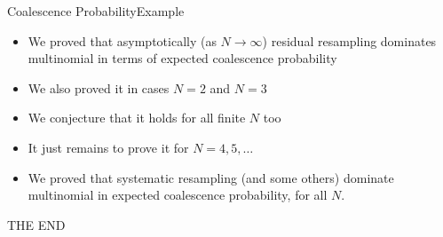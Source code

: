 \documentclass[aspectratio=169]{beamer}
\theoremstyle{definition}
\begin{document}
\begin{frame}{Coalescence Probability}{Example}
\centering

\end{frame}


\begin{frame}
\begin{itemize}
\item We proved that asymptotically (as $N\to\infty$) residual resampling dominates multinomial in terms of expected coalescence probability
\item We also proved it in cases $N=2$ and $N=3$
\pause
\item We conjecture that it holds for all finite $N$ too
\item It just remains to prove it for $N=4,5,\dots$
\pause
\item We proved that systematic resampling (and some others) dominate multinomial in expected coalescence probability, for all $N$.
\end{itemize}
\end{frame}


\begin{frame}
\centering
THE END
\end{frame}
\end{document}
